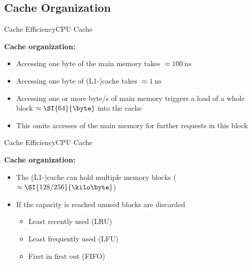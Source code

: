 
\subsection{Cache Organization}

\begin{frame}{Cache Efficiency}{CPU Cache}
  \vspace{-1.5em}
  \begin{figure}
    \begin{adjustbox}{width=\linewidth}
      
    \end{adjustbox}
    \label{fig:caching:cache_hirarchy}
  \end{figure}
  \textbf{Cache organization:}
  \begin{itemize}
    \item
      Accessing one byte of the main memory takes
      $\approx\SI{100}{\nano\second}$
    \item
      Accessing one byte of (L1-)cache takes
      $\approx\SI{1}{\nano\second}$
    \item
      Accessing one or more byte/s of main memory triggers a load of a whole
      block $\approx\SI{64}{\byte}$ into the cache
    \item
      This omits accesses of the main memory for further requests in this block
  \end{itemize}
\end{frame}


\begin{frame}{Cache Efficiency}{CPU Cache}
  \vspace{-1.5em}
  \begin{figure}
    \begin{adjustbox}{width=\linewidth}
      
    \end{adjustbox}
    \label{fig:caching:cache_hirarchy2}
  \end{figure}
  \textbf{Cache organization:}
  \begin{itemize}
    \item
      The (L1-)cache can hold multiple memory blocks
      ($\approx\SI{128/256}{\kilo\byte}$)
    \item
      If the capacity is reached unused blocks are discarded
      \begin{itemize}
        \item
          {\color{Mittel-Blau}Least recently used (LRU)}
        \item
          {\color{Mittel-Blau}Least frequently used (LFU)}
        \item
          {\color{Mittel-Blau}First in first out (FIFO)}
      \end{itemize}
  \end{itemize}
\end{frame}

